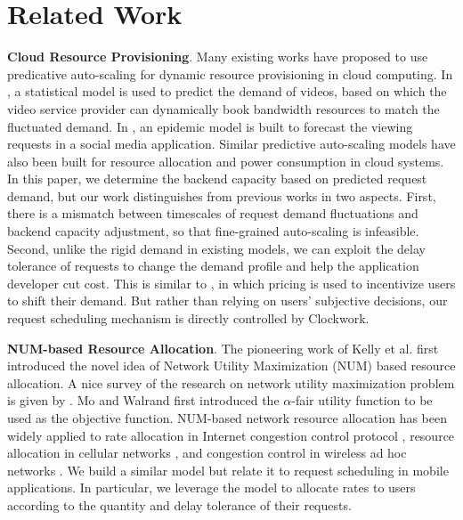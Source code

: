 \section{Related Work}\label{sec:related}

\textbf{Cloud Resource Provisioning}. Many existing works have proposed to use predicative auto-scaling for dynamic resource provisioning in cloud computing. In \cite{niu2011demand, niu2012quality}, a statistical model is used to predict the demand of videos, based on which the video service provider can dynamically book bandwidth resources to match the fluctuated demand. In \cite{wu2012scaling, wu2015scaling}, an epidemic model is built to forecast the viewing requests in a social media application. Similar predictive auto-scaling models have also been built for resource allocation \cite{tang2007scalable, gong2010press, wang2011consolidating} and power consumption \cite{kusic2009power, lin2013dynamic} in cloud systems. In this paper, we determine the backend capacity based on predicted request demand, but our work distinguishes from previous works in two aspects. First, there is a mismatch between timescales of request demand fluctuations and backend capacity adjustment, so that fine-grained auto-scaling is infeasible.  Second, unlike the rigid demand in existing models, we can exploit the delay tolerance of requests to change the demand profile and help the application developer cut cost. This is similar to \cite{ha2012tube}, in which pricing is used to incentivize users to shift their demand. But rather than relying on users' subjective decisions, our request scheduling mechanism is directly controlled by Clockwork.       


\textbf{NUM-based Resource Allocation}. The pioneering work of Kelly et al. \cite{kelly1998rate} first introduced the novel idea of Network Utility Maximization (NUM) based resource allocation. A nice survey of the research on network utility maximization problem is given by \cite{yi2008stochastic}. Mo and Walrand \cite{mo2000fair} first introduced the $\alpha$-fair utility function to be used as the objective function. NUM-based network resource allocation has been widely applied to rate allocation in Internet congestion control protocol \cite{chiang2006stochastic}, resource allocation in cellular networks \cite{stolyar2005asymptotic}, and congestion control in wireless ad hoc networks \cite{neely2008fairness}. We build a similar model but relate it to request scheduling in mobile applications. In particular, we leverage the model to allocate rates to users according to the quantity and delay tolerance of their requests.     

